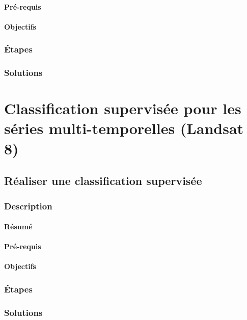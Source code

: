 \documentclass[a4paper,11pt,twoside,openright]{article}
\begin{document}
\paragraph{Pré-requis}
\label{sec-3-2-1-2}


\paragraph{Objectifs}
\label{sec-3-2-1-3}

\subsubsection{Étapes}
\label{sec-3-2-2}

\subsubsection{Solutions}
\label{sec-3-2-3}
\section{Classification supervisée pour les séries multi-temporelles (Landsat 8)}
\label{sec-4}
\subsection{Réaliser une classification supervisée}
\label{sec-4-1}
\subsubsection{Description}
\label{sec-4-1-1}
\paragraph{Résumé}
\label{sec-4-1-1-1}

\paragraph{Pré-requis}
\label{sec-4-1-1-2}


\paragraph{Objectifs}
\label{sec-4-1-1-3}

\subsubsection{Étapes}
\label{sec-4-1-2}

\subsubsection{Solutions}
\label{sec-4-1-3}
\end{document}
